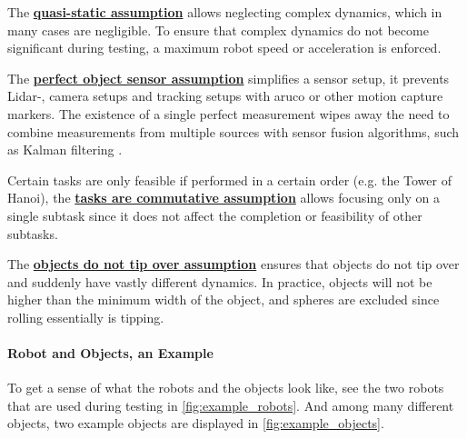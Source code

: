 The \hyperref[assumption:quasi_static]{\textbf{quasi-static assumption}} allows neglecting complex dynamics, which in many cases are negligible. To ensure that complex dynamics do not become significant during testing, a maximum robot speed or acceleration is enforced.\bs
{}

The \hyperref[assumption:perfect_object_sensor]{\textbf{perfect object sensor assumption}} simplifies a sensor setup, it prevents Lidar-, camera setups and tracking setups with aruco or other motion capture markers. The existence of a single perfect measurement wipes away the need to combine measurements from multiple sources with sensor fusion algorithms, such as Kalman filtering \cite{verhaegen_filtering_2007}.\bs

Certain tasks are only feasible if performed in a certain order (e.g. the Tower of Hanoi), the \hyperref[assumption:order_does_not_matter]{\textbf{tasks are commutative assumption}} allows focusing only on a single subtask since it does not affect the completion or feasibility of other subtasks.\bs

The \hyperref[assumption:no_tipping]{\textbf{objects do not tip over assumption}} ensures that objects do not tip over and suddenly have vastly different dynamics. In practice, objects will not be higher than the minimum width of the object, and spheres are excluded since rolling essentially is tipping.

\paragraph{Robot and Objects, an Example}
To get a sense of what the robots and the objects look like, see the two robots that are used during testing in \cref{fig:example_robots}. And among many different objects, two example objects are displayed in \cref{fig:example_objects}.

